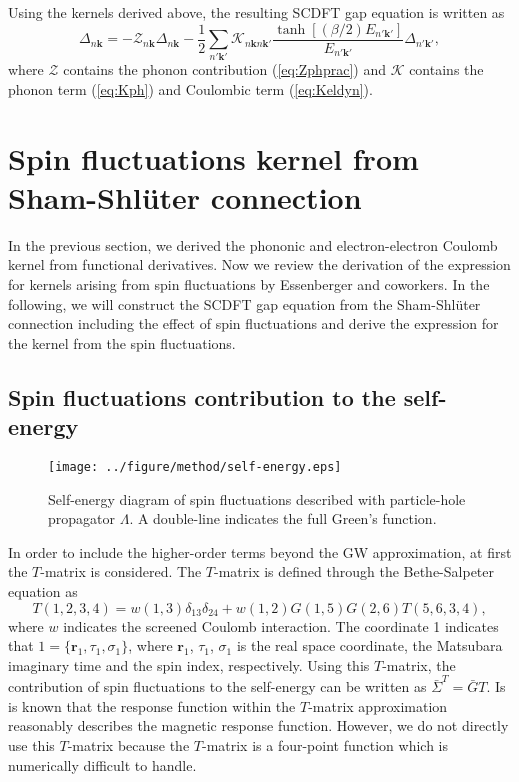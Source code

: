 Using the kernels derived above, the resulting SCDFT gap equation is written as
%
\begin{equation}
	\Delta_{n\bm k} = -{\mathcal Z}_{n \bm k}\Delta_{n\bm k} - \frac{1}{2}
	\sum_{n'\bm k'}{\mathcal K}_{n\bm k n \bm k'}
	\frac{\tanh[(\beta/2)E_{n' \bm k'}]}{E_{n' \bm k'}}\Delta_{n' \bm k'},
	\label{eq:truegapeq}
\end{equation}
%
where $\mathcal Z$ contains the phonon contribution (\ref{eq:Zphprac}) and $\mathcal K$ contains 
the phonon term (\ref{eq:Kph}) and Coulombic term (\ref{eq:Keldyn}).
\section{Spin fluctuations kernel from Sham-Shl\"{u}ter connection}
In the previous section, we derived the phononic and 
electron-electron Coulomb kernel from functional derivatives.
Now we review the derivation of the expression for kernels arising 
from spin fluctuations by Essenberger and coworkers\cite{Essenberger2014}.
In the following, we will construct the SCDFT gap equation from the Sham-Shl\"{u}ter connection
including the effect of spin fluctuations and derive the expression for the kernel from the spin fluctuations.

\subsection{Spin fluctuations contribution to the self-energy}

\begin{figure} %
	\centering
	\texttt{[image: ../figure/method/self-energy.eps]}
	\caption{Self-energy diagram of spin fluctuations described with particle-hole propagator $\Lambda$. A double-line indicates the full Green's function.}
	\label{fig:SF-self}
\end{figure}

In order to include the higher-order terms beyond the GW approximation, at first the $T$-matrix\cite{Gordon1961,Ersoy2010} is considered.
The $T$-matrix is defined through the Bethe-Salpeter equation\cite{BSE1951} as
%
\begin{equation}
	T(1,2,3,4) = w(1,3)\delta_{13}\delta_{24} + 
	w(1,2)G(1,5)G(2,6)T(5,6,3,4),
	\label{eq:T-BSE}
\end{equation}
%
where $w$ indicates the screened Coulomb interaction.
The coordinate 1 indicates that $1=\{\bm r_1, \tau_1, \sigma_1\}$, 
where $\bm r_1$, $\tau_1$, $\sigma_1$ is the real space coordinate,
the Matsubara imaginary time and the spin index, respectively.
Using this $T$-matrix, the contribution of spin fluctuations to the self-energy can be written as $\bar{\Sigma}^{T}=\bar{G}T$.
Is is known that the response function within the $T$-matrix approximation reasonably describes the magnetic response function\cite{Ersoy2010,Onida2002}.
However, we do not directly use this $T$-matrix because the $T$-matrix is a four-point function
which is numerically difficult to handle.


